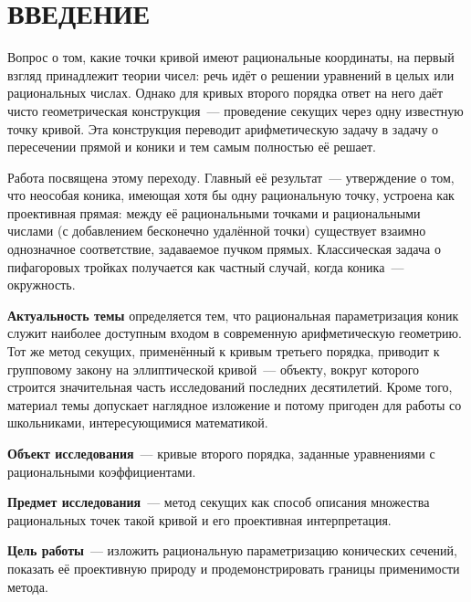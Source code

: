 \documentclass[a4paper,14pt]{extreport}
\theoremstyle{definition}
\begin{document}
\renewcommand{\contentsname}{ОГЛАВЛЕНИЕ}
\tableofcontents
\newpage

\chapter*{ВВЕДЕНИЕ}

Вопрос о том, какие точки кривой имеют рациональные координаты, на первый
взгляд принадлежит теории чисел: речь идёт о решении уравнений в целых или
рациональных числах. Однако для кривых второго порядка ответ на него даёт
чисто геометрическая конструкция~--- проведение секущих через одну известную
точку кривой. Эта конструкция переводит арифметическую задачу в задачу о
пересечении прямой и коники и тем самым полностью её решает.

Работа посвящена этому переходу. Главный её результат~---
утверждение о том, что неособая коника, имеющая хотя бы одну
рациональную точку, устроена как проективная прямая: между её рациональными
точками и рациональными числами (с добавлением бесконечно удалённой точки)
существует взаимно однозначное соответствие, задаваемое пучком прямых.
Классическая задача о пифагоровых тройках получается как частный случай, когда
коника~--- окружность.

\textbf{Актуальность темы} определяется тем, что рациональная параметризация
коник служит наиболее доступным входом в современную арифметическую геометрию.
Тот же метод секущих, применённый к кривым третьего порядка, приводит к
групповому закону на эллиптической кривой~--- объекту, вокруг которого строится
значительная часть исследований последних десятилетий. Кроме того, материал
темы допускает наглядное изложение и потому пригоден для работы со школьниками,
интересующимися математикой.

\textbf{Объект исследования}~--- кривые второго порядка, заданные уравнениями
с рациональными коэффициентами.

\textbf{Предмет исследования}~--- метод секущих как способ описания множества
рациональных точек такой кривой и его проективная интерпретация.

\textbf{Цель работы}~--- изложить рациональную параметризацию конических
сечений, показать её проективную природу и продемонстрировать границы
применимости метода.
\end{document}
